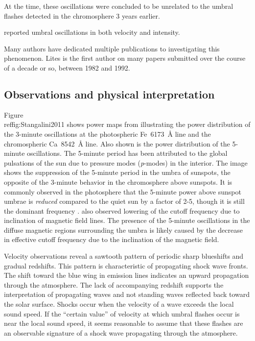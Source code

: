 At the time, these oscillations were concluded to be unrelated to the umbral
flashes detected in the chromosphere 3 years earlier.


\cite{Giovanelli1972} reported umbral oscillations in both velocity and intensity.

Many authors have dedicated multiple publications to investigating
this phenomenon. Lites is the first author on many papers submitted
over the course of a decade or so, between 1982 and 1992.

\subsection{Observations and physical interpretation}


Figure~\\ref{fig:Stangalini2011} shows power maps from
\cite{Stangalini2011} illustrating the power distribution of the
3-minute oscillations at the photospheric Fe~6173~\AA{} line and the
chromospheric Ca~8542~\AA{} line. Also shown is the power distribution
of the 5-minute oscillations. The 5-minute period has been attributed
to the global pulsations of the sun due to pressure modes
(\textit{p}-modes) in the interior. The image shows the suppression of
the 5-minute period in the umbra of sunspots, the opposite of the
3-minute behavior in the chromosphere above sunspots. It is commonly
observed in the photosphere that the 5-minute power above sunspot
umbrae is \emph{reduced} compared to the quiet sun by a factor of 2-5,
though it is still the dominant frequency
\citep{Felipe2010, Bogdan2006}.
\cite{Reznikova2012} also observed lowering of the cutoff frequency
due to inclination of magnetic field lines.
The presence of the 5-minute oscillations in the diffuse magnetic regions
surrounding the umbra is likely caused by the decrease in effective
cutoff frequency due to the inclination of the magnetic field.


Velocity observations reveal a sawtooth
pattern of periodic sharp blueshifts and gradual redshifts.
This pattern is characteristic of propagating shock wave fronts.
The shift toward the blue wing in emission lines indicates an
upward propagation through the atmosphere.
The lack of accompanying redshift supports the interpretation of propagating
waves and not standing waves reflected back toward the solar surface.
Shocks occur when the velocity of a wave exceeds the local
sound speed.
If the ``certain value'' of velocity at which umbral flashes occur is near
the local sound speed, it seems reasonable to assume that these flashes
are an observable signature of a shock wave propagating through the
atmosphere.

